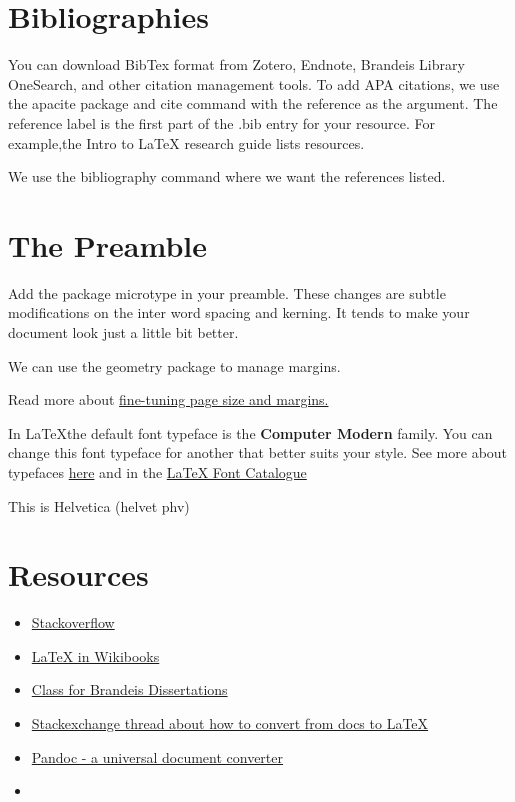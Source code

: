 \documentclass{article}
\begin{document}
\section{Bibliographies}
You can download BibTex format from Zotero, Endnote, Brandeis Library OneSearch, and other citation management tools.  To add APA citations, we use the apacite package and cite command with the reference as the argument.  The reference label is the first part of the .bib entry for your resource.  For example,the Intro to LaTeX research guide \cite{ClairePontbriand2019ItL} lists resources.

We use the bibliography command where we want the references listed.



\section{The Preamble}
Add the package microtype in your preamble. These changes are subtle modifications on the inter word spacing and kerning. It tends to make your document look just a little bit better.

We can use the geometry package to manage margins.

Read more about \href{https://www.overleaf.com/learn/latex/Page_size_and_margins}{fine-tuning page size and margins.}

{\selectfont
In \LaTeX the default font typeface is the \textbf{Computer Modern} family. You can change this font typeface for another that better suits your style.
See more about typefaces \href{https://www.overleaf.com/learn/latex/Font_typefaces}{here} and in the \href{https://tug.org/FontCatalogue/}{LaTeX Font Catalogue}

This is Helvetica	(helvet	phv)
}

\section{Resources}
\begin{itemize}
    \item \href{https://stackoverflow.com/}{Stackoverflow}
    \item \href{https://en.wikibooks.org/wiki/LaTeX}{LaTeX in Wikibooks}
    \item \href{https://www.ctan.org/pkg/brandeis-dissertation?lang=en}{Class for Brandeis Dissertations}
    \item \href{https://tex.stackexchange.com/questions/183358/how-to-convert-a-google-docs-document-to-latex}{Stackexchange thread about how to convert from docs to \LaTeX}
    \item \href{https://pandoc.org/}{Pandoc - a universal document converter}
    \item \href{}{}
\end{itemize}


\end{document}
